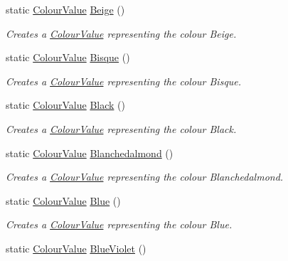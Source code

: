 \begin{DoxyCompactItemize}
static \hyperlink{classMezzanine_1_1ColourValue}{ColourValue} \hyperlink{classMezzanine_1_1ColourValue_a959998773dead2ffb4935977bab3f010}{Beige} ()
\begin{DoxyCompactList}\small\item\em Creates a \hyperlink{classMezzanine_1_1ColourValue}{ColourValue} representing the colour Beige. \item\end{DoxyCompactList}\item 
static \hyperlink{classMezzanine_1_1ColourValue}{ColourValue} \hyperlink{classMezzanine_1_1ColourValue_a1cdbedc9e362a70ac747725321b736df}{Bisque} ()
\begin{DoxyCompactList}\small\item\em Creates a \hyperlink{classMezzanine_1_1ColourValue}{ColourValue} representing the colour Bisque. \item\end{DoxyCompactList}\item 
static \hyperlink{classMezzanine_1_1ColourValue}{ColourValue} \hyperlink{classMezzanine_1_1ColourValue_a07482f09f118de47519a862fd190a9f8}{Black} ()
\begin{DoxyCompactList}\small\item\em Creates a \hyperlink{classMezzanine_1_1ColourValue}{ColourValue} representing the colour Black. \item\end{DoxyCompactList}\item 
static \hyperlink{classMezzanine_1_1ColourValue}{ColourValue} \hyperlink{classMezzanine_1_1ColourValue_abc05d056e4d28d77d03aaa521b547ac3}{Blanchedalmond} ()
\begin{DoxyCompactList}\small\item\em Creates a \hyperlink{classMezzanine_1_1ColourValue}{ColourValue} representing the colour Blanchedalmond. \item\end{DoxyCompactList}\item 
static \hyperlink{classMezzanine_1_1ColourValue}{ColourValue} \hyperlink{classMezzanine_1_1ColourValue_aaad55c22ddce89cee754a06d674c0b51}{Blue} ()
\begin{DoxyCompactList}\small\item\em Creates a \hyperlink{classMezzanine_1_1ColourValue}{ColourValue} representing the colour Blue. \item\end{DoxyCompactList}\item 
static \hyperlink{classMezzanine_1_1ColourValue}{ColourValue} \hyperlink{classMezzanine_1_1ColourValue_a7c4b9e52b49d53ea4cdb619358889423}{BlueViolet} ()

\end{DoxyCompactItemize}
